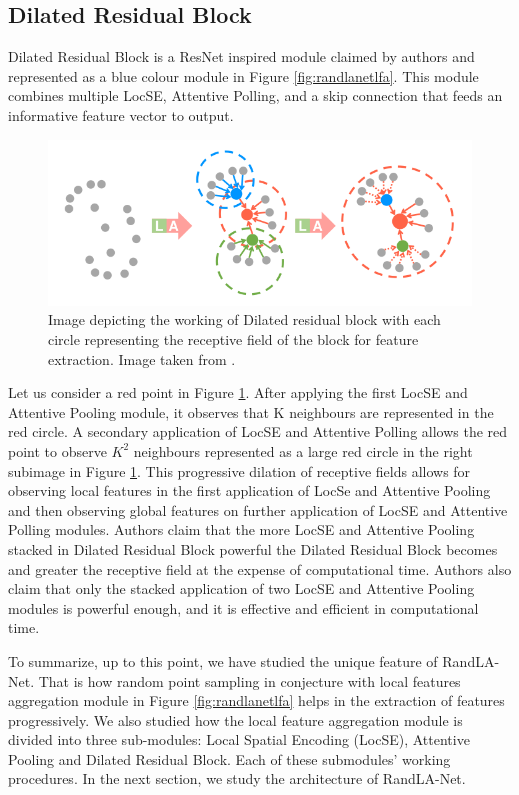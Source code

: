 \subsection{Dilated Residual Block}
Dilated Residual Block is a ResNet inspired module claimed by authors and represented as a blue colour module in Figure \ref{fig:randlanetlfa}.
This module combines multiple LocSE, Attentive Polling, and a skip connection that feeds an informative feature vector to output.
\begin{figure}
    \centering
    \includegraphics[scale=0.5]{images/dilatedresidualblock.png}
    \caption{Image depicting the working of Dilated residual block with each circle representing the receptive field of the block for feature extraction. Image taken from \cite{Hu_2020_CVPR_Randla}.}
    \label{fig:dilatedresidualblock}
\end{figure}
Let us consider a red point in Figure \ref{fig:dilatedresidualblock}. After applying the first LocSE and Attentive Pooling module, it observes that K neighbours are represented in the red circle.
A secondary application of LocSE and Attentive Polling allows the red point to observe $K^{2}$ neighbours represented as a large red circle in the right subimage in Figure \ref{fig:dilatedresidualblock}.
This progressive dilation of receptive fields allows for observing local features in the first application of LocSe and Attentive Pooling and then observing global features on further application of LocSE and Attentive Polling modules.
Authors claim that the more LocSE and Attentive Pooling stacked in Dilated Residual Block powerful the Dilated Residual Block becomes and greater the receptive field at the expense of computational time.
Authors also claim that only the stacked application of two LocSE and Attentive Pooling modules is powerful enough, and it is effective and efficient in computational time.

To summarize, up to this point, we have studied the unique feature of RandLA-Net. That is how random point sampling in conjecture with local features aggregation module in Figure \ref{fig:randlanetlfa} helps in the extraction of features progressively.
We also studied how the local feature aggregation module is divided into three sub-modules: Local Spatial Encoding (LocSE), Attentive Pooling and Dilated Residual Block. Each of these submodules' working procedures.
In the next section, we study the architecture of RandLA-Net.

